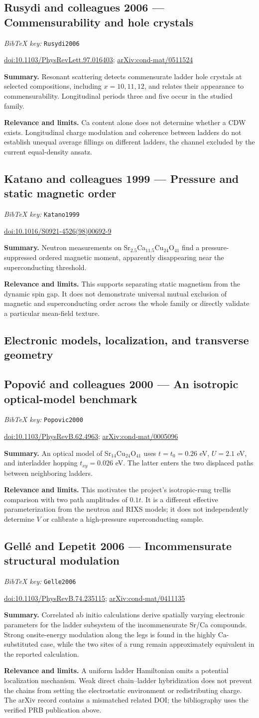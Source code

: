 \documentclass[11pt]{article}
\newcommand{\paper}[2]{\Needspace{8\baselineskip}\subsection{#2}\label{paper:#1}\textit{BibTeX key:} \texttt{#1}\quad\citep{#1}\par}
\newcommand{\doi}[1]{\href{https://doi.org/#1}{doi:#1}}
\newcommand{\arxiv}[1]{\href{https://arxiv.org/abs/#1}{arXiv:#1}}
\newcommand{\summary}{\par\textbf{Summary.} }
\newcommand{\relevance}{\par\textbf{Relevance and limits.} }
\begin{document}
\paper{Rusydi2006}{Rusydi and colleagues 2006 --- Commensurability and hole crystals}
\doi{10.1103/PhysRevLett.97.016403}; \arxiv{cond-mat/0511524}
\summary Resonant scattering detects commensurate ladder hole crystals at selected compositions, including $x=10,11,12$, and relates their appearance to commensurability. Longitudinal periods three and five occur in the studied family.
\relevance Ca content alone does not determine whether a CDW exists. Longitudinal charge modulation and coherence between ladders do not establish unequal average fillings on different ladders, the channel excluded by the current equal-density ansatz.

\paper{Katano1999}{Katano and colleagues 1999 --- Pressure and static magnetic order}
\doi{10.1016/S0921-4526(98)00692-9}
\summary Neutron measurements on Sr$_{2.5}$Ca$_{11.5}$Cu$_{24}$O$_{41}$ find a pressure-suppressed ordered magnetic moment, apparently disappearing near the superconducting threshold.
\relevance This supports separating static magnetism from the dynamic spin gap. It does not demonstrate universal mutual exclusion of magnetic and superconducting order across the whole family or directly validate a particular mean-field texture.

\subsection*{Electronic models, localization, and transverse geometry}

\paper{Popovic2000}{Popovi\'c and colleagues 2000 --- An isotropic optical-model benchmark}
\doi{10.1103/PhysRevB.62.4963}; \arxiv{cond-mat/0005096}
\summary An optical model of Sr$_{14}$Cu$_{24}$O$_{41}$ uses $t=t_0=0.26$ eV, $U=2.1$ eV, and interladder hopping $t_{xy}=0.026$ eV. The latter enters the two displaced paths between neighboring ladders.
\relevance This motivates the project's isotropic-rung trellis comparison with two path amplitudes of $0.1t$. It is a different effective parameterization from the neutron and RIXS models; it does not independently determine $V$ or calibrate a high-pressure superconducting sample.

\paper{Gelle2006}{Gell\'e and Lepetit 2006 --- Incommensurate structural modulation}
\doi{10.1103/PhysRevB.74.235115}; \arxiv{cond-mat/0411135}
\summary Correlated ab initio calculations derive spatially varying electronic parameters for the ladder subsystem of the incommensurate Sr/Ca compounds. Strong onsite-energy modulation along the legs is found in the highly Ca-substituted case, while the two sites of a rung remain approximately equivalent in the reported calculation.
\relevance A uniform ladder Hamiltonian omits a potential localization mechanism. Weak direct chain--ladder hybridization does not prevent the chains from setting the electrostatic environment or redistributing charge. The arXiv record contains a mismatched related DOI; the bibliography uses the verified PRB publication above.
\end{document}
